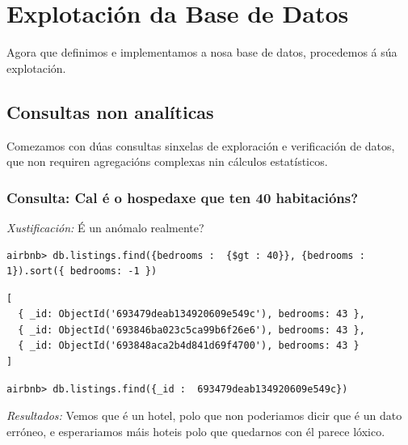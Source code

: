 \documentclass[12pt,a4paper]{article}
\begin{document}
\section{Explotación da Base de Datos}
Agora que definimos e implementamos a nosa base de datos, procedemos á súa explotación.

\subsection{Consultas non analíticas}

Comezamos con dúas consultas sinxelas de exploración e verificación de datos, que non requiren agregacións complexas nin cálculos estatísticos.

\subsubsection{Consulta: Cal é o hospedaxe que ten 40 habitacións?}
\label{consulta:atipico}

\emph{Xustificación:} É un anómalo realmente? 

\begin{lstlisting}
airbnb> db.listings.find({bedrooms :  {$gt : 40}}, {bedrooms : 1}).sort({ bedrooms: -1 })
\end{lstlisting}

\begin{lstlisting}[style=terminal]
[
  { _id: ObjectId('693479deab134920609e549c'), bedrooms: 43 },
  { _id: ObjectId('693846ba023c5ca99b6f26e6'), bedrooms: 43 },
  { _id: ObjectId('693848aca2b4d841d69f4700'), bedrooms: 43 }
]
\end{lstlisting}

\begin{lstlisting}
airbnb> db.listings.find({_id :  693479deab134920609e549c})
\end{lstlisting}

\emph{Resultados:} Vemos que é un hotel, polo que non poderiamos dicir que é un dato erróneo, e esperariamos máis hoteis polo que quedarnos con él parece lóxico.
\end{document}
